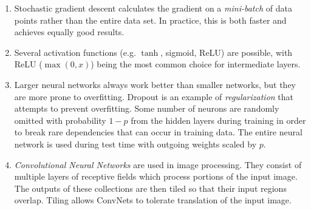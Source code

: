 \documentclass[10pt]{article}
\begin{document}
\begin{multicols}{2}
\begin{addmargin}[0.8em]{0.5em}
\begin{enumerate}[label=(\alph*)]
        \item Stochastic gradient descent calculates the gradient on a \textit{mini-batch} of data points rather than the entire data set. In practice, this is both faster and achieves equally good results.
        \item Several activation functions (e.g. $\tanh$, sigmoid, ReLU) are possible, with ReLU ($\max(0,x)$) being the most common choice for intermediate layers.
        \item Larger neural networks always  work better than smaller networks, but they are more prone to overfitting. Dropout is an example of \textit{regularization} that attempts to prevent overfitting. Some number of neurons are randomly omitted with probability $1-p$ from the hidden layers during training in order to break rare dependencies that can occur in training data. The entire neural network is used during test time with outgoing weights scaled by $p$.
        \item \textit{Convolutional Neural Networks} are used in image processing. They consist of multiple layers of receptive fields which process portions of the input image. The outputs of these collections are then tiled so that their input regions overlap. Tiling allows ConvNets to tolerate translation of the input image.
    \end{enumerate}
\end{addmargin}

\end{multicols}
\end{document}
